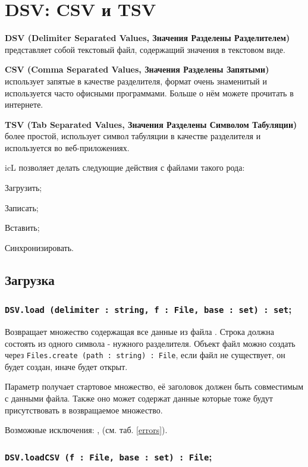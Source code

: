 \section{DSV: CSV и TSV}

{\bf DSV (Delimiter Separated Values, Значения Разделены Разделителем)} представляет собой текстовый файл, содержащий значения в текстовом виде.

{\bf CSV (Comma Separated Values, Значения Разделены Запятыми)} использует запятые в качестве разделителя, формат очень знаменитый и используется часто офисными программами. Больше о нём можете прочитать в интернете.

{\bf TSV (Tab Separated Values, Значения Разделены Символом Табуляции)} более простой, использует символ табуляции в качестве разделителя и используется во веб-приложениях.

icL позволяет делать следующие действия с файлами такого рода:
\begin{icItems}
	\item Загрузить;
	\item Записать;
	\item Вставить;
	\item Синхронизировать.
\end{icItems}

\subsection{Загрузка}

\subsubsection{\lstinline|DSV.load (delimiter : string, f : File, base : set) : set|;}

Возвращает множество содержащая все данные из файла . Строка  должна состоять из одного символа - нужного разделителя. Объект файл можно создать через \lstinline|Files.create (path : string) : File|, если файл не существует, он будет создан, иначе будет открыт.

Параметр  получает стартовое множество, её заголовок должен быть совместимым с данными файла. Также оно может содержат данные которые тоже будут присутствовать в возвращаемое множество. 

Возможные исключения: ,  (см. таб. \ref{errors}).

\subsubsection{\lstinline|DSV.loadCSV (f : File, base : set) : File|;}

